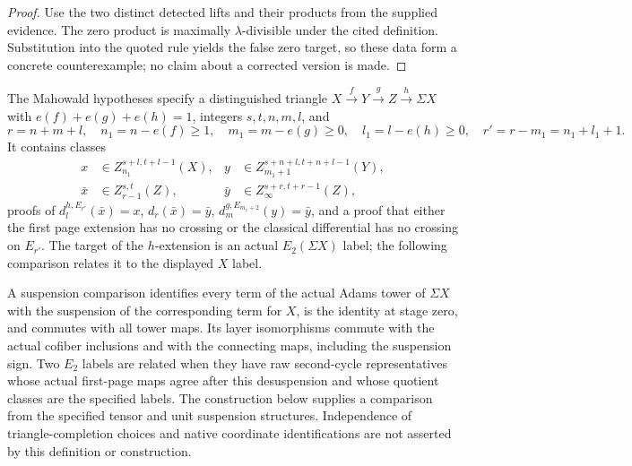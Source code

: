 \begin{proof}
  Use the two distinct detected lifts and their products from the supplied
  evidence.  The zero product is maximally $\lambda$-divisible under the cited
  definition.  Substitution into the quoted rule yields the false zero target,
  so these data form a concrete counterexample; no claim about a corrected
  version is made.
\end{proof}

\begin{definition}
  \label{def:mahowald-input-data}
  \notready
  The Mahowald hypotheses specify a distinguished triangle
  $X\xrightarrow fY\xrightarrow gZ\xrightarrow h\Sigma X$ with
  $e(f)+e(g)+e(h)=1$, integers $s,t,n,m,l$, and
  \[
    r=n+m+l,\quad n_1=n-e(f)\ge1,\quad
    m_1=m-e(g)\ge0,\quad l_1=l-e(h)\ge0,\quad
    r'=r-m_1=n_1+l_1+1.
  \]
  It contains classes
  \[
  \begin{aligned}
    x&\in Z_{n_1}^{s+l,t+l-1}(X),&
    y&\in Z_{m_1+1}^{s+n+l,t+n+l-1}(Y),\\
    \bar x&\in Z_{r-1}^{s,t}(Z),&
    \bar y&\in Z_\infty^{s+r,t+r-1}(Z),
  \end{aligned}
  \]
  proofs of $d_l^{h,E_{r'}}(\bar x)=x$, $d_r(\bar x)=\bar y$,
  $d_m^{g,E_{m_1+2}}(y)=\bar y$, and a proof that either the first page
  extension has no crossing or the classical differential has no crossing on
  $E_{r'}$.
  The target of the $h$-extension is an actual $E_2(\Sigma X)$
  label; the following comparison relates it to the displayed $X$ label.
\end{definition}

\begin{definition}
  \label{def:mahowald-tower-suspension-comparison}
  \leanok
  A suspension comparison identifies every term of the actual Adams tower
  of $\Sigma X$ with the suspension of the corresponding term for $X$,
  is the identity at stage zero, and commutes with all tower maps. Its
  layer isomorphisms commute with the actual cofiber inclusions and with
  the connecting maps, including the suspension sign. Two $E_2$ labels
  are related when they have raw second-cycle representatives whose
  actual first-page maps agree after this desuspension and whose quotient
  classes are the specified labels. The construction below supplies a
  comparison from the specified tensor and unit suspension structures.
  Independence of triangle-completion choices and native coordinate
  identifications are not asserted by this definition or construction.
\end{definition}

